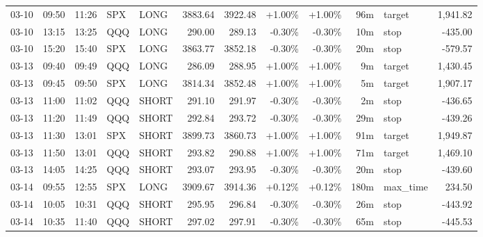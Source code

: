 \documentclass[11pt,a4paper]{article}
\begin{document}
\begin{center}
\begin{longtable}{>{\color{txtmain}}l l l l l r r r r r >{\color{txtmain}}l r}
03-10 & 09:50 & 11:26 & SPX & LONG & 3883.64 & 3922.48 & \textcolor{wingreen}{+1.00\%} & \textcolor{wingreen}{+1.00\%} & 96m & target & \textcolor{wingreen}{1,941.82} \\
03-10 & 13:15 & 13:25 & QQQ & LONG & 290.00 & 289.13 & \textcolor{lossred}{-0.30\%} & \textcolor{lossred}{-0.30\%} & 10m & stop & \textcolor{lossred}{-435.00} \\
03-10 & 15:20 & 15:40 & SPX & LONG & 3863.77 & 3852.18 & \textcolor{lossred}{-0.30\%} & \textcolor{lossred}{-0.30\%} & 20m & stop & \textcolor{lossred}{-579.57} \\
03-13 & 09:40 & 09:49 & QQQ & LONG & 286.09 & 288.95 & \textcolor{wingreen}{+1.00\%} & \textcolor{wingreen}{+1.00\%} & 9m & target & \textcolor{wingreen}{1,430.45} \\
03-13 & 09:45 & 09:50 & SPX & LONG & 3814.34 & 3852.48 & \textcolor{wingreen}{+1.00\%} & \textcolor{wingreen}{+1.00\%} & 5m & target & \textcolor{wingreen}{1,907.17} \\
03-13 & 11:00 & 11:02 & QQQ & SHORT & 291.10 & 291.97 & \textcolor{lossred}{-0.30\%} & \textcolor{lossred}{-0.30\%} & 2m & stop & \textcolor{lossred}{-436.65} \\
03-13 & 11:20 & 11:49 & QQQ & SHORT & 292.84 & 293.72 & \textcolor{lossred}{-0.30\%} & \textcolor{lossred}{-0.30\%} & 29m & stop & \textcolor{lossred}{-439.26} \\
03-13 & 11:30 & 13:01 & SPX & SHORT & 3899.73 & 3860.73 & \textcolor{wingreen}{+1.00\%} & \textcolor{wingreen}{+1.00\%} & 91m & target & \textcolor{wingreen}{1,949.87} \\
03-13 & 11:50 & 13:01 & QQQ & SHORT & 293.82 & 290.88 & \textcolor{wingreen}{+1.00\%} & \textcolor{wingreen}{+1.00\%} & 71m & target & \textcolor{wingreen}{1,469.10} \\
03-13 & 14:05 & 14:25 & QQQ & SHORT & 293.07 & 293.95 & \textcolor{lossred}{-0.30\%} & \textcolor{lossred}{-0.30\%} & 20m & stop & \textcolor{lossred}{-439.60} \\
03-14 & 09:55 & 12:55 & SPX & LONG & 3909.67 & 3914.36 & \textcolor{wingreen}{+0.12\%} & \textcolor{wingreen}{+0.12\%} & 180m & max\_time & \textcolor{wingreen}{234.50} \\
03-14 & 10:05 & 10:31 & QQQ & SHORT & 295.95 & 296.84 & \textcolor{lossred}{-0.30\%} & \textcolor{lossred}{-0.30\%} & 26m & stop & \textcolor{lossred}{-443.92} \\
03-14 & 10:35 & 11:40 & QQQ & SHORT & 297.02 & 297.91 & \textcolor{lossred}{-0.30\%} & \textcolor{lossred}{-0.30\%} & 65m & stop & \textcolor{lossred}{-445.53} \\

\end{longtable}
\end{center}
\end{document}
